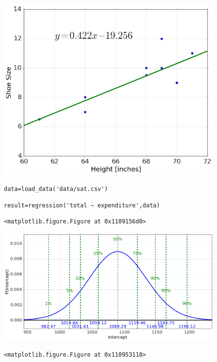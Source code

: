 \begin{center}\includegraphics[width=4.5in]{Regression/Regression_fig3.png}\end{center}

\begin{lstlisting}
data=load_data('data/sat.csv')
\end{lstlisting}

\begin{lstlisting}
result=regression('total ~ expenditure',data)
\end{lstlisting}

\begin{verbatim}
<matplotlib.figure.Figure at 0x1109156d0>\end{verbatim}

\begin{center}\includegraphics[width=4.5in]{Regression/Regression_fig4.png}\end{center}

\begin{verbatim}
<matplotlib.figure.Figure at 0x110953110>\end{verbatim}

